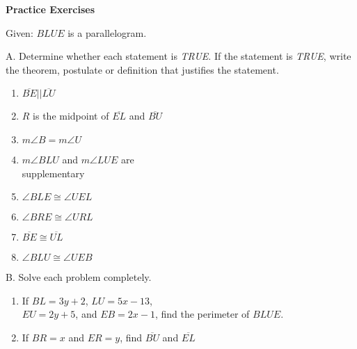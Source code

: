 \def\lenA{1.5in}
\def\leninnersep{\lenA}

\textbf{Practice Exercises}

Given: $BLUE$ is a parallelogram. 

A. Determine whether each statement is \emph{TRUE}. If the statement is \emph{TRUE}, write the theorem, postulate or definition that justifies the statement.
{\begin{enumerate}[label = \arabic*. ]
\item $\overline{BE} || \overline{LU}$ 
\item $R$ is the midpoint of $\overline{EL}$ and $\overline{BU}$
\item $m\angle{B}= m\angle{U}$ 
\item $m\angle{BLU}$ and $m\angle{LUE}$ are \\supplementary
\item $\angle{BLE} \cong \angle{UEL}$ 
\item $\angle{BRE} \cong  \angle{URL}$ 

\item $\overline{BE} \cong \overline{UL}$
\item $\angle{BLU} \cong \angle{UEB}$ 

\end{enumerate}}

B. Solve each problem completely. 
\begin{enumerate}[label = \arabic*. ]
\item If $BL = 3y +2$, $LU=5x - 13$, \\$EU= 2y +5$, and $EB=2x-1$, find the perimeter of $BLUE$.
\item If $BR =x$ and $ER =y$, find $\overline{BU}$ and $\overline{EL}$

\end{enumerate} 

\vspace*{-17ex}\hspace*{16em} 
\vspace*{14ex}